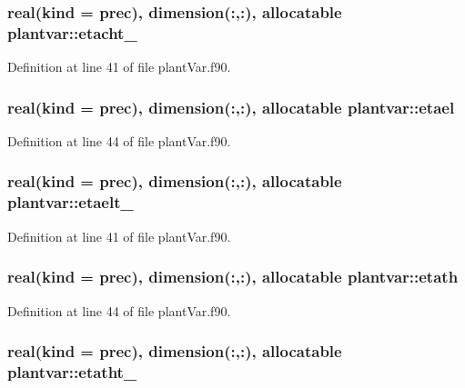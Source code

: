 \hypertarget{classplantvar_a1bfe35beb70f107ed930740d7ce7189a}{
\subsubsection[{etacht\-\_\-}]{\setlength{\rightskip}{0pt plus 5cm}real(kind = prec), dimension(\-:,\-:), allocatable plantvar\-::etacht\-\_\-}}\label{classplantvar_a1bfe35beb70f107ed930740d7ce7189a}


Definition at line 41 of file plant\-Var.\-f90.

\hypertarget{classplantvar_a1a1a32a309c970c5ccccda52cbc92e36}{
\subsubsection[{etael}]{\setlength{\rightskip}{0pt plus 5cm}real(kind = prec), dimension(\-:,\-:), allocatable plantvar\-::etael}}\label{classplantvar_a1a1a32a309c970c5ccccda52cbc92e36}


Definition at line 44 of file plant\-Var.\-f90.

\hypertarget{classplantvar_a42c8e330560c87b991b46be04c40a03d}{
\subsubsection[{etaelt\-\_\-}]{\setlength{\rightskip}{0pt plus 5cm}real(kind = prec), dimension(\-:,\-:), allocatable plantvar\-::etaelt\-\_\-}}\label{classplantvar_a42c8e330560c87b991b46be04c40a03d}


Definition at line 41 of file plant\-Var.\-f90.

\hypertarget{classplantvar_a226f4150db308d7f4c46da8f297127af}{
\subsubsection[{etath}]{\setlength{\rightskip}{0pt plus 5cm}real(kind = prec), dimension(\-:,\-:), allocatable plantvar\-::etath}}\label{classplantvar_a226f4150db308d7f4c46da8f297127af}


Definition at line 44 of file plant\-Var.\-f90.

\hypertarget{classplantvar_a355b18c048762925b750fe247a09c4cd}{
\subsubsection[{etatht\-\_\-}]{\setlength{\rightskip}{0pt plus 5cm}real(kind = prec), dimension(\-:,\-:), allocatable plantvar\-::etatht\-\_\-}}\label{classplantvar_a355b18c048762925b750fe247a09c4cd}


